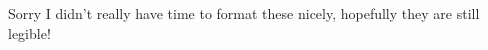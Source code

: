 \documentclass[hidelinks,12pt]{article}
\title{\scalebox{2}{Math 531 Homework 7}}
\author{\scalebox{1.5}{Theo Koss}}
\date{March 2021}
\begin{document}
\graphicspath{{/home/theo/Documents/GitHub/Math-Homeworks/Math 531/Random/}}
\maketitle
Sorry I didn't really have time to format these nicely, hopefully they are still legible!
\newpage{}\newpage{}\newpage{}
\end{document}
